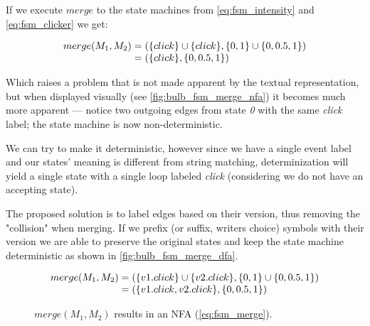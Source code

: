 \documentclass[a4paper]{article}
\begin{document}
If we execute $merge$ to the state machines from \autoref{eq:fsm_intensity} and \autoref{eq:fsm_clicker} we get:

\begin{equation}
    \begin{array}{r@{}l}
        merge(M_1, M_2) & {}= (\{click\} \cup \{click\}, \{0, 1\} \cup \{0, 0.5, 1\}) \\
                        & {}= (\{click\}, \{0, 0.5, 1\})
    \end{array}
\end{equation}

Which raises a problem that is not made apparent by the textual representation, but when
displayed visually (see \autoref{fig:bulb_fsm_merge_nfa}) it becomes much more apparent —
notice two outgoing edges from state \emph{0} with the same \emph{click} label; the state machine is now non-deterministic.

We can try to make it deterministic, however since we have a single event label and
our states' meaning is different from string matching,
determinization will yield a single state with a single loop labeled \emph{click}
(considering we do not have an accepting state).

The proposed solution is to label edges based on their version, thus removing the "collision" when merging.
If we prefix (or suffix, writers choice) symbols with their version
we are able to preserve the original states and keep the state machine deterministic
as shown in \autoref{fig:bulb_fsm_merge_dfa}.

\begin{equation}
    \begin{array}{r@{}l}
        merge(M_1, M_2) & {}= (\{v1.click\} \cup \{v2.click\}, \{0, 1\} \cup \{0, 0.5, 1\}) \\
                        & {}= (\{v1.click, v2.click\}, \{0, 0.5, 1\})
    \end{array}
    \label{eq:fsm_merge_fixed}
\end{equation}


\begin{figure}[ht]
    \centering
    \caption{$merge(M_1, M_2)$ results in an NFA (\autoref{eq:fsm_merge}).}
    \label{fig:bulb_fsm_merge_nfa}
\end{figure}
\end{document}
